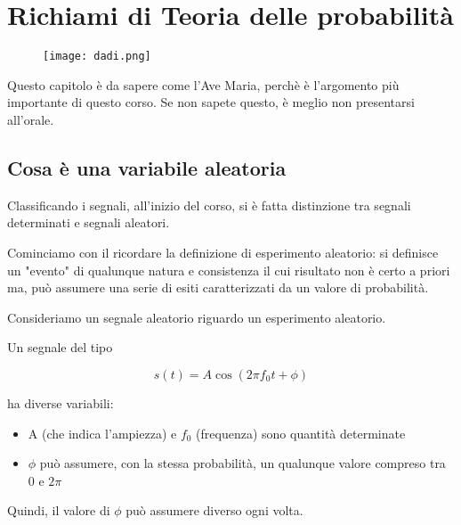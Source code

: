 \chapter{Richiami di Teoria delle probabilità} 

\begin{figure}[h]
    \centering
    \texttt{[image: dadi.png]}
\end{figure} 

\newpage 

\begin{tcolorbox}
Questo capitolo è da sapere come l'Ave Maria, perchè è l'argomento più importante di questo corso. \newline 
Se non sapete questo, è meglio non presentarsi all'orale.     
\end{tcolorbox}

\section{Cosa è una variabile aleatoria} 

Classificando i segnali, all'inizio del corso, si è fatta distinzione tra segnali determinati e segnali aleatori. \newline 

Cominciamo con il ricordare la definizione di esperimento aleatorio: 
si definisce un "evento" di qualunque natura e consistenza il cui risultato non è certo a priori ma, 
può assumere una serie di esiti caratterizzati da un valore di probabilità. \newline 

Consideriamo un segnale aleatorio riguardo un esperimento aleatorio. \newline 

Un segnale del tipo

{
    \Large 
    \begin{equation}
        s(t) = A \cos(2 \pi f_0 t +\phi)
    \end{equation}
}

ha diverse variabili: 

\begin{itemize}
    \item A (che indica l'ampiezza) e $f_0$ (frequenza) sono quantità determinate 
    \item $\phi$ può assumere, con la stessa probabilità, un qualunque valore compreso tra $0$ e $2\pi$ 
\end{itemize}

Quindi, il valore di $\phi$ può assumere diverso ogni volta. \newline 

